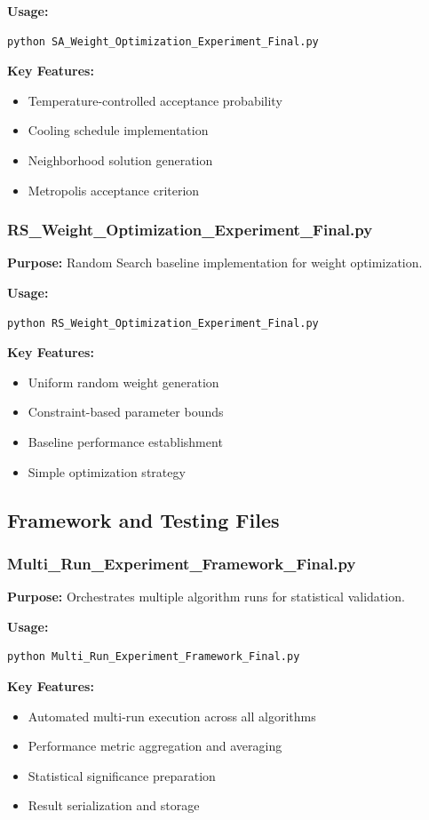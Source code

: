 \textbf{Usage:}
\begin{verbatim}
python SA_Weight_Optimization_Experiment_Final.py
\end{verbatim}

\textbf{Key Features:}
\begin{itemize}
\item Temperature-controlled acceptance probability
\item Cooling schedule implementation
\item Neighborhood solution generation
\item Metropolis acceptance criterion
\end{itemize}

\subsubsection{RS\_Weight\_Optimization\_Experiment\_Final.py}
\textbf{Purpose:} Random Search baseline implementation for weight optimization.

\textbf{Usage:}
\begin{verbatim}
python RS_Weight_Optimization_Experiment_Final.py
\end{verbatim}

\textbf{Key Features:}
\begin{itemize}
\item Uniform random weight generation
\item Constraint-based parameter bounds
\item Baseline performance establishment
\item Simple optimization strategy
\end{itemize}

\subsection{Framework and Testing Files}

\subsubsection{Multi\_Run\_Experiment\_Framework\_Final.py}
\textbf{Purpose:} Orchestrates multiple algorithm runs for statistical validation.

\textbf{Usage:}
\begin{verbatim}
python Multi_Run_Experiment_Framework_Final.py
\end{verbatim}

\textbf{Key Features:}
\begin{itemize}
\item Automated multi-run execution across all algorithms
\item Performance metric aggregation and averaging
\item Statistical significance preparation
\item Result serialization and storage
\end{itemize}

